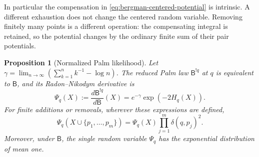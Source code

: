 \documentclass[11pt,a4paper]{article}
\numberwithin{equation}{section}
\newtheorem{proposition}[theorem]{Proposition}
\theoremstyle{definition}
\theoremstyle{remark}
\begin{document}
In particular the compensation in \eqref{eq:bergman-centered-potential}
is intrinsic.  A different exhaustion does not change the centered
random variable.  Removing finitely many points is a different operation:
the compensating integral is retained, so the potential changes by the
ordinary finite sum of their pair potentials.

\begin{proposition}[Normalized Palm likelihood]
\label{prop:bergman-palm-likelihood}
Let $\gamma=\lim_{n\to\infty}(\sum_{k=1}^n k^{-1}-\log n)$.
The reduced Palm law $\mathsf B^{!q}$ at $q$ is equivalent to $\mathsf B$,
and its Radon--Nikodym derivative is
\begin{equation}
 \Psi_q(X):=\frac{d\mathsf B^{!q}}{d\mathsf B}(X)
 =e^{-\gamma}\exp(-2H_q(X)).
 \label{eq:bergman-palm-likelihood}
\end{equation}
For finite additions or removals, wherever these expressions are defined,
\begin{equation}
 \Psi_q(X\cup\{p_1,\ldots,p_m\})
 =\Psi_q(X)\prod_{j=1}^m\delta(q,p_j)^2.
 \label{eq:bergman-palm-multiplicativity}
\end{equation}
Moreover, under $\mathsf B$, the single random variable $\Psi_q$ has the
exponential distribution of mean one.
\end{proposition}
\end{document}
